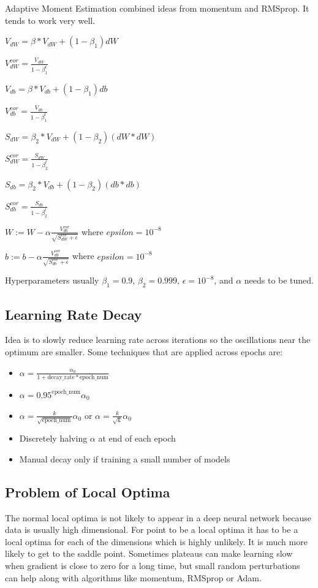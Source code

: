 Adaptive Moment Estimation combined ideas from momentum and RMSprop. It tends to work very well.

$V_{dW} = \beta * V_{dW} + (1 - \beta_1) dW$

$V_{dW}^{cor} = \frac{V_{dW}}{1 - \beta_1 ^t}$

$V_{db} = \beta * V_{db} + (1 - \beta_1) db$

$V_{db}^{cor} = \frac{V_{db}}{1 - \beta_1 ^t}$ 

$S_{dW} = \beta_2 * V_{dW} + (1 - \beta_2) (dW * dW)$ 

$S_{dW}^{cor} = \frac{S_{dW}}{1 - \beta_2 ^t}$

$S_{db} = \beta_2 * V_{db} + (1 - \beta_2) (db * db)$

$S_{db}^{cor} = \frac{S_{db}}{1 - \beta_2 ^t}$ 

$W := W - \alpha \frac{V_{db}^{cor}}{\sqrt{S_{dW}^{cor} + \epsilon}}$ where $epsilon = 10^{-8}$

$b := b - \alpha \frac{V_{db}^{cor}}{\sqrt{S_{db}^{cor} + \epsilon}}$ where $epsilon = 10^{-8}$

Hyperparameters usually $\beta_1 = 0.9$, $\beta_2 = 0.999$, $\epsilon = 10^{-8}$, and $\alpha$ needs to be tuned.

\subsection{Learning Rate Decay}

Idea is to slowly reduce learning rate across iterations so the oscillations near the optimum are smaller. Some techniques that are applied across epochs are:

\begin{itemize}[wide, labelwidth=!, labelindent=0pt]
\itemsep0em 
    \item $\alpha = \frac{\alpha_0}{1 + \text{decay\_rate} * \text{epoch\_num}}$
    \item $\alpha = 0.95^{\text{epoch\_num}}\alpha_0$
    \item $\alpha = \frac{k}{\sqrt{\text{epoch\_num}}}\alpha_0$ or $\alpha = \frac{k}{\sqrt{\text{k}}}\alpha_0$ 
    \item Discretely halving $\alpha$ at end of each epoch \vspace*{-\baselineskip}
    \item Manual decay only if training a small number of models
\end{itemize}

\subsection{Problem of Local Optima}

The normal local optima is not likely to appear in a deep neural network because data is usually high dimensional. For point to be a local optima it has to be a local optima for each of the dimensions which is highly unlikely. It is much more likely to get to the saddle point. Sometimes plateaus can make learning slow when gradient is close to zero for a long time, but small random perturbations can help along with algorithms like momentum, RMSprop or Adam.

